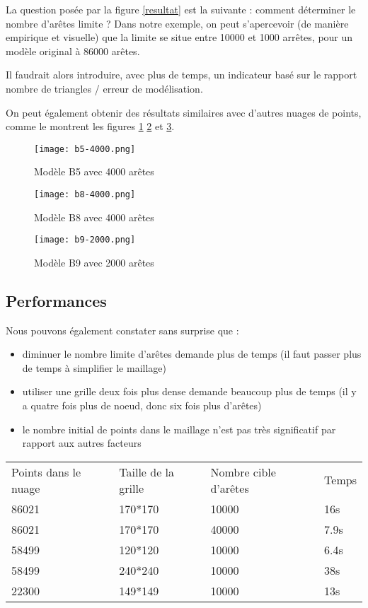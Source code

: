 La question posée par la figure \ref{resultat} est la suivante : comment déterminer le nombre d'arêtes limite ? Dans notre exemple, on peut s'apercevoir (de manière empirique et visuelle) que la limite se situe entre 10000 et 1000 arrêtes, pour un modèle original à 86000 arêtes.

Il faudrait alors introduire, avec plus de temps, un indicateur basé sur le rapport nombre de triangles / erreur de modélisation.

On peut également obtenir des résultats similaires avec d'autres nuages de points, comme le montrent les figures \ref{b5}  \ref{b8} et \ref{b9}.

\begin{figure}[H]
  \centering
   \texttt{[image: b5-4000.png]}
   \caption{Modèle B5 avec 4000 arêtes}
   \label{b5}
\end{figure}
\begin{figure}[H]
  \centering
   \texttt{[image: b8-4000.png]}
   \caption{Modèle B8 avec 4000 arêtes}
   \label{b8}
\end{figure}
\begin{figure}[H]
  \centering
   \texttt{[image: b9-2000.png]}
   \caption{Modèle B9 avec 2000 arêtes}
   \label{b9}
\end{figure}


\subsection{Performances}
Nous pouvons également constater sans surprise que :
\begin{itemize}
 \item diminuer le nombre limite d'arêtes demande plus de temps (il faut passer plus de temps à simplifier le maillage)
 \item utiliser une grille deux fois plus dense demande beaucoup plus de temps (il y a quatre fois plus de noeud, donc six fois plus d'arêtes)
 \item le nombre initial de points dans le maillage n'est pas très significatif par rapport aux autres facteurs
\end{itemize}

\begin{center}
\begin{xtabular}[]{llll}
Points dans le nuage & Taille de la grille & Nombre cible d'arêtes & Temps \\
86021 & 170*170 & 10000 & 16s\\
86021 & 170*170 & 40000 & 7.9s\\
58499 & 120*120 & 10000 & 6.4s\\
58499 & 240*240 & 10000 & 38s\\
22300 & 149*149 & 10000 & 13s
\end{xtabular}
\end{center}
